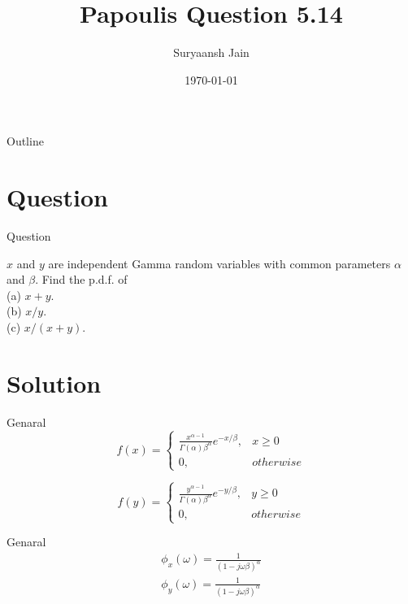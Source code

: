 \documentclass{beamer}
\title{Papoulis Question 5.14}
\author{Suryaansh Jain}
\date{\today}
\begin{document}
\begin{frame}
    \titlepage 
\end{frame}

\logo{}


\begin{frame}{Outline}
    \tableofcontents
\end{frame}


\section{Question}
\begin{frame}{Question}

$x$ and $y$ are independent Gamma random variables with  common parameters $\alpha$ and $\beta$. Find the p.d.f. of \\ 
(a) $x + y$. \\ 
(b) $x/y$. \\ 
(c) $x/(x +y)$.
\end{frame}

\section{Solution}
\begin{frame}{Genaral}
    \begin{equation}
        f(x) = 
        \begin{cases}
            \frac{x^{\alpha - 1}}{\Gamma (\alpha) {\beta}^{\alpha}} e^{-x/\beta}, & x \geq 0 \\
            0, & otherwise
        \end{cases}
    \end{equation}
        
    \begin{equation}
        f(y) = 
        \begin{cases}
            \frac{y^{\alpha - 1}}{\Gamma (\alpha) {\beta}^{\alpha}} e^{-y/\beta}, & y \geq 0 \\
            0, & otherwise
        \end{cases}
    \end{equation}
\end{frame} 

\begin{frame}{Genaral}
    \begin{align}
        \phi_x (\omega) = \frac{1}{(1 - j \omega \beta )^\alpha} \\
        \phi_y (\omega) = \frac{1}{(1 - j \omega \beta )^\alpha}
    \end{align}
\end{frame}
\end{document}
